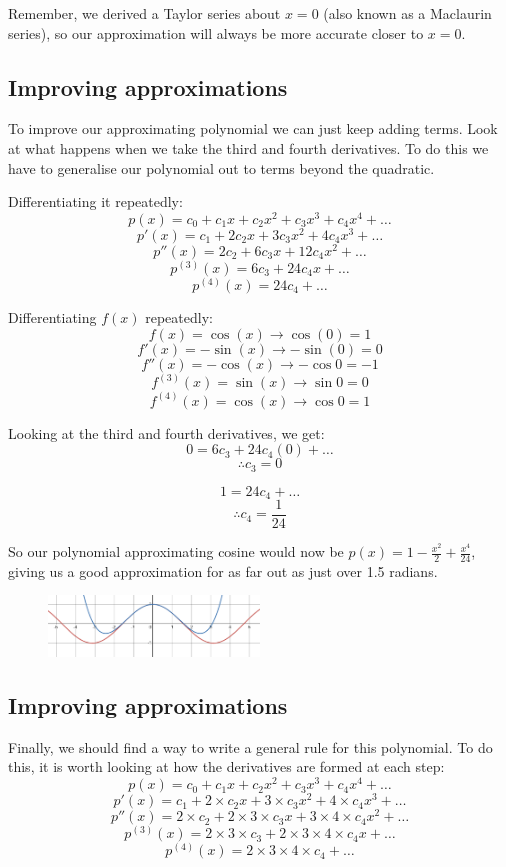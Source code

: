 \documentclass[../main.tex]{subfiles}
\begin{document}
Remember, we derived a Taylor series about $x=0$ (also known as a Maclaurin series), so our approximation will always be more accurate closer to $x=0$.

\subsection*{Improving approximations}
To improve our approximating polynomial we can just keep adding terms. Look at what happens when we take the third and fourth derivatives. To do this we have to generalise our polynomial out to terms beyond the quadratic.

Differentiating it repeatedly:
\[p(x) = c_0 + c_1x + c_2x^2 + c_3x^3 + c_4x^4 + \dots\]
\[p'(x) = c_1 + 2c_2x + 3c_3x^2 + 4c_4x^3 + \dots\]
\[p''(x) = 2c_2 + 6c_3x + 12c_4x^2 + \dots\]
\[p^{(3)}(x) = 6c_3 + 24c_4x + \dots\]
\[p^{(4)}(x) = 24c_4 + \dots\]

Differentiating $f(x)$ repeatedly:
\[f(x) = \cos{(x)} \rightarrow \cos{(0)}=1\]
\[f'(x) = -\sin{(x)} \rightarrow -\sin{(0)}=0\]
\[f''(x) = -\cos{(x)} \rightarrow -\cos{0}=-1\]
\[f^{(3)}(x) = \sin{(x)} \rightarrow \sin{0}=0\]
\[f^{(4)}(x) = \cos{(x)} \rightarrow \cos{0}=1\]

Looking at the third and fourth derivatives, we get:
\[0 = 6c_3 + 24c_4(0) + \dots\]
\[\therefore c_3 = 0\]

\[1 = 24c_4 + \dots\]
\[\therefore c_4 = \frac{1}{24}\]

So our polynomial approximating cosine would now be $p(x) = 1 - \frac{x^2}{2} + \frac{x^4}{24}$, giving us a good approximation for as far out as just over 1.5 radians.
\begin{figure}[h]
    \centering
    \includegraphics[width=0.5\textwidth]{images/taylorseries4.png}
\end{figure}

\subsection*{Improving approximations}
Finally, we should find a way to write a general rule for this polynomial. To do this, it is worth looking at how the derivatives are formed at each step:
\[p(x) = c_0 + c_1x + c_2x^2 + c_3x^3 + c_4x^4 + \dots\]
\[p'(x) = c_1 + 2\times c_2x + 3\times c_3x^2 + 4\times c_4x^3 + \dots\]
\[p''(x) = 2\times c_2 + 2\times 3\times c_3x + 3\times 4\times c_4x^2 + \dots\]
\[p^{(3)}(x) = 2\times 3\times c_3 + 2\times 3\times 4\times c_4x + \dots\]
\[p^{(4)}(x) = 2\times 3\times 4\times c_4 + \dots\]
\end{document}
